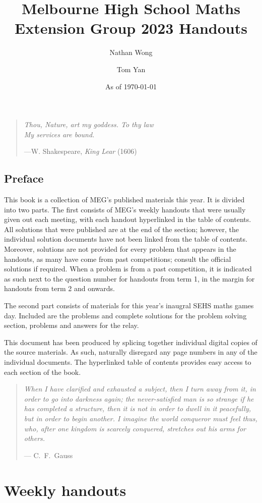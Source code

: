 \documentclass[a4paper]{amsbook}
\title{\textbf{Melbourne High School Maths Extension Group 2023 Handouts}}
\author{Nathan Wong\and Tom Yan}
\date{As of \today}
\newif\ifded
\newcommand{\epigraph}[2]{%
\newpage \vspace*{8cm}
\thispagestyle{empty}
  \begin{quote}
	  {	
    \emph{#1}
    \begin{flushright}---{#2}
    \end{flushright}}
  \end{quote}}
\begin{document}
\maketitle
\ifded
\newpage \vspace*{8cm}
\thispagestyle{empty}
\begin{center}
	  \emph{For Harold}
\end{center}
\fi
\epigraph{Thou, Nature, art my goddess. To thy law\\
My services are bound.}{W. Shakespeare, \emph{King Lear} (1606)}
\chapter*{Preface}
This book is a collection of MEG's published
materials this year. 
It is divided into two parts.
The first consists of MEG's weekly handouts
that were usually given out each meeting, with each
handout hyperlinked in the table of contents.
All solutions that were published are
at the end of the section; however, the individual
solution documents have not been linked from the table
of contents. Moreover, solutions are not provided
for every problem that appears in the handouts,
as many have come from past competitions; consult the official
solutions if required.
When a problem is from a past competition, it is indicated as such
next to the question number for handouts from term 1, in the margin
for handouts from term 2 and onwards.

The second part consists of materials for this year's inaugral
SEHS maths games day. Included
are the problems and complete solutions for the problem
solving section, problems and answers for the relay.

This document has been produced by splicing together
individual digital copies of the source materials.
As such, naturally disregard any page numbers in any
of the individual documents. The hyperlinked table of contents
provides easy access to each section of the book.
\tableofcontents
\epigraph{ When I have clarified and exhausted a subject,
then I turn away from it, in order to go into darkness again;
the never-satisfied man is so strange if he has completed a structure,
then it is not in order to dwell in it peacefully, but in order to begin another.
I imagine the world conqueror must feel thus, who,
after one kingdom is scarcely conquered, stretches out his arms for others.}{%
	C.~F.~Gauss}
\part{Weekly handouts}
\end{document}
